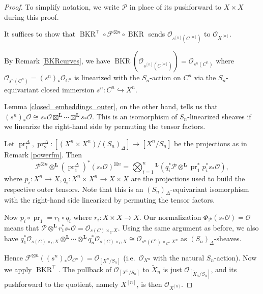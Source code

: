 \documentclass{amsart}
\theoremstyle{plain}
\theoremstyle{definition}
\theoremstyle{remark}
\begin{document}
    \begin{proof}
        To simplify notation, we write $\mathcal P$ in place of its pushforward to $X\times X$ during this proof.

        It suffices to show that $\operatorname{BKR}^\top\circ\mathcal F^{\boxtimes n}\circ\operatorname{BKR}$ sends $\mathcal O_{s^{[n]}(C^{[n]})}$ to $\mathcal O_{X^{[n]}}$.
    
        By Remark \ref{BKRcurves}, we have $\operatorname{BKR}(\mathcal O_{s^{[n]}(C^{[n]})})=\mathcal O_{s^n(C^n)}$ where $\mathcal O_{s^n(C^n)}=(s^n)_\ast\mathcal O_{C^n}$ is linearized with the $S_n$-action on $C^n$ via the $S_n$-equivariant closed immersion $s^n:C^n\hookrightarrow X^n$.

        Lemma \ref{closed_embeddings_outer}, on the other hand, tells us that $(s^n)_\ast\mathcal O\cong s_\ast\mathcal O\boxtimes^{\mathbf L}\cdots\boxtimes^{\mathbf L} s_\ast\mathcal O$.
        This is an isomorphism of $S_n$-linearized sheaves if we linearize the right-hand side by permuting the tensor factors.

        Let $\operatorname{pr}_1^\Delta,\operatorname{pr}_2^\Delta:[(X^n\times X^n)/(S_n)_\Delta]\to [X^n/S_n]$ be the projections as in Remark \ref{powerfm}.
        Then
        \[
        \mathcal P^{\boxtimes n}\otimes^{\mathbf L}(\operatorname{pr}_1^\Delta)^\ast(s_\ast\mathcal O)^{\boxtimes n}=\bigotimes_{i=1}^n{}^{\mathbf L}(q_i^\ast\mathcal P\otimes^{\mathbf L}\operatorname{pr}_1^\ast p_i^\ast s_\ast\mathcal O),
        \]
        where $p_i:X^n\to X,q_i:X^n\times X^n\to X\times X$ are the projections used to build the respective outer tensors.
        Note that this is an $(S_n)_\Delta$-equivariant isomorphism with the right-hand side linearized by permuting the tensor factors.

        Now $p_i\circ\operatorname{pr}_1=r_1\circ q_i$ where $r_i:X\times X\to X$.
        Our normalization $\Phi_{\mathcal P}(s_\ast\mathcal O)=\mathcal O$ means that $\mathcal P\otimes^{\mathbf L}r_1^\ast s_\ast\mathcal O=\mathcal O_{s(C)\times_CX}$.
        Using the same argument as before, we also have $q_1^\ast\mathcal O_{s(C)\times_CX}\otimes^{\mathbf L}\cdots\otimes^{\mathbf L}q_n^\ast\mathcal O_{s(C)\times_CX}\cong \mathcal O_{s^n(C^n)\times_{C^n}X^n}$ as $(S_n)_\Delta$-sheaves.

        Hence $\mathcal F^{\boxtimes n}((s^n)_\ast\mathcal O_{C^n})=\mathcal O_{[X^n/S_n]}$ (i.e.~$\mathcal O_{X^n}$ with the natural $S_n$-action).
        Now we apply $\operatorname{BKR}^\top$.
        The pullback of $\mathcal O_{[X^n/S_n]}$ to $\tilde{X}_n$ is just $\mathcal O_{[\tilde{X}_n/S_n]}$, and its pushforward to the quotient, namely $X^{[n]}$, is then $\mathcal O_{X^{[n]}}$.
    \end{proof}
\end{document}
